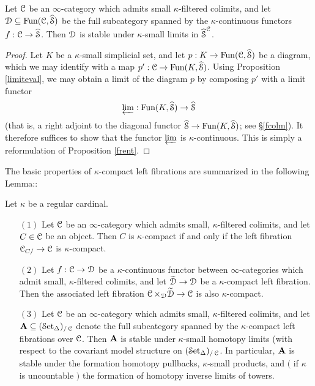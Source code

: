\begin{lemma}\label{misst}
Let $\operatorname{\mathcal{C}}$ be an $\infty$-category which admits small $\kappa$-filtered colimits,
and let $\operatorname{\mathcal{D}} \subseteq \operatorname{Fun}(\operatorname{\mathcal{C}}, \widehat{\operatorname{\mathcal{S}}})$ be the full subcategory spanned by the $\kappa$-continuous functors $f: \operatorname{\mathcal{C}} \rightarrow \widehat{\operatorname{\mathcal{S}}}$. Then $\operatorname{\mathcal{D}}$ is stable under $\kappa$-small limits in $\widehat{\operatorname{\mathcal{S}}}^{\operatorname{\mathcal{C}}}$.
\end{lemma}

\begin{proof}
Let $K$ be a $\kappa$-small simplicial set, and let $p: K \rightarrow \operatorname{Fun}(\operatorname{\mathcal{C}}, \widehat{\operatorname{\mathcal{S}}})$ be a diagram, which we may identify with a map $p': \operatorname{\mathcal{C}} \rightarrow \operatorname{Fun}(K, \widehat{\operatorname{\mathcal{S}}})$. Using Proposition \ref{limiteval}, we may obtain a limit of the diagram $p$ by composing $p'$ with a limit functor
$$\varprojlim: \operatorname{Fun}(K,\widehat{\operatorname{\mathcal{S}}}) \rightarrow \widehat{\operatorname{\mathcal{S}}}$$
(that is, a right adjoint to the diagonal functor $\widehat{\operatorname{\mathcal{S}}} \rightarrow \operatorname{Fun}(K,\widehat{\operatorname{\mathcal{S}}})$; see \S \ref{fcolm}). It therefore suffices to show that the functor $\varprojlim$ is $\kappa$-continuous. This is simply a reformulation of Proposition \ref{frent}.
\end{proof}

The basic properties of $\kappa$-compact left fibrations are summarized in the following Lemma::

\begin{lemma}\label{hardstuff0}
Let $\kappa$ be a regular cardinal.

\begin{itemize}
\item[$(1)$] Let $\operatorname{\mathcal{C}}$ be an $\infty$-category which admits small, $\kappa$-filtered colimits, and let $C \in \operatorname{\mathcal{C}}$ be an object. Then $C$ is $\kappa$-compact if and only if the left fibration $\operatorname{\mathcal{C}}_{C/} \rightarrow \operatorname{\mathcal{C}}$ is $\kappa$-compact.

\item[$(2)$] Let $f: \operatorname{\mathcal{C}} \rightarrow \operatorname{\mathcal{D}}$ be a $\kappa$-continuous functor between
$\infty$-categories which admit small, $\kappa$-filtered colimits, and let
$\widetilde{\operatorname{\mathcal{D}}} \rightarrow \operatorname{\mathcal{D}}$ be a $\kappa$-compact left fibration. Then
the associated left fibration $\operatorname{\mathcal{C}} \times_{\operatorname{\mathcal{D}}} \widetilde{\operatorname{\mathcal{D}}} \rightarrow \operatorname{\mathcal{C}}$
is also $\kappa$-compact.

\item[$(3)$] Let $\operatorname{\mathcal{C}}$ be an $\infty$-category which admits small, $\kappa$-filtered colimits, and let ${\mathbf A} \subseteq (\operatorname{\mathcal{S}et_{\Delta}})_{/\operatorname{\mathcal{C}}}$ denote the full subcategory spanned by the
$\kappa$-compact left fibrations over $\operatorname{\mathcal{C}}$. Then ${\mathbf A}$ is stable under
$\kappa$-small homotopy limits (with respect to the covariant model structure on $(\operatorname{\mathcal{S}et_{\Delta}})_{/\operatorname{\mathcal{C}}}$. 
In particular, ${\mathbf A}$ is stable under the formation homotopy pullbacks, $\kappa$-small products, and $($ if $\kappa$ is uncountable $)$ the formation of homotopy inverse limits of towers.
\end{itemize}
\end{lemma}

